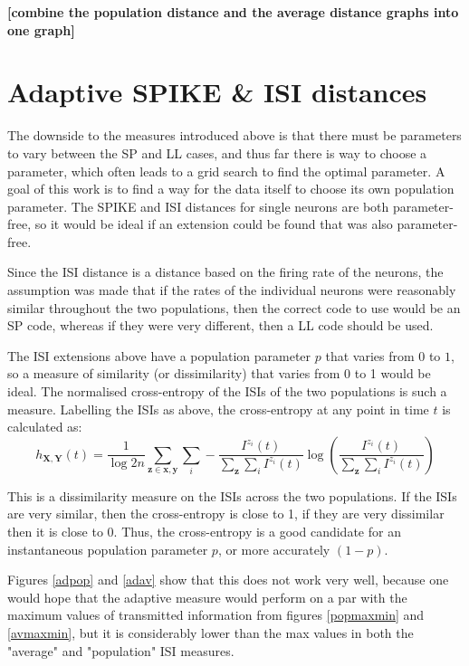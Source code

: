{\bf [combine the population distance and the average distance graphs into one graph]}

\newpage
\section{Adaptive SPIKE \& ISI distances}

The downside to the measures introduced above is that there must be parameters to vary between the SP and LL cases, and thus far there is way to choose a parameter, which often leads to a grid search to find the optimal parameter.  A goal of this work is to find a way for the data itself to choose its own population parameter.  The SPIKE and ISI distances for single neurons are both parameter-free, so it would be ideal if an extension could be found that was also parameter-free.

Since the ISI distance is a distance based on the firing rate of the neurons, the assumption was made that if the rates of the individual neurons were reasonably similar throughout the two populations, then the correct code to use would be an SP code, whereas if they were very different, then a LL code should be used.



The ISI extensions above have a population parameter $p$ that varies from $0$ to $1$, so a measure of similarity (or dissimilarity) that varies from 0 to 1 would be ideal.  The normalised cross-entropy of the ISIs of the two populations is such a measure.  Labelling the ISIs as above, the cross-entropy at any point in time $t$ is calculated as:
\begin{equation}
h_{\mathbf{X}, \mathbf{Y}}(t) = \frac{1}{\log 2n}\sum_{\mathbf{z}\in\mathbf{x,y}}\sum_i -\frac{I^{z_i}(t)}{\sum_{\mathbf{z}}\sum_i I^{z_i}(t)} \log\left(\frac{I^{z_i}(t)}{\sum_{\mathbf{z}}\sum_i I^{z_i}(t)}\right)
\end{equation}

This is a dissimilarity measure on the ISIs across the two populations.  If the ISIs are very similar, then the cross-entropy is close to 1, if they are very dissimilar then it is close to 0.  Thus, the cross-entropy is a good candidate for an instantaneous population parameter $p$, or more accurately $(1-p)$.

Figures \ref{adpop} and \ref{adav} show that this does not work very well, because one would hope that the adaptive measure would perform on a par with the maximum values of transmitted information from figures \ref{popmaxmin} and \ref{avmaxmin}, but it is considerably lower than the max values in both the "average" and "population" ISI measures.

